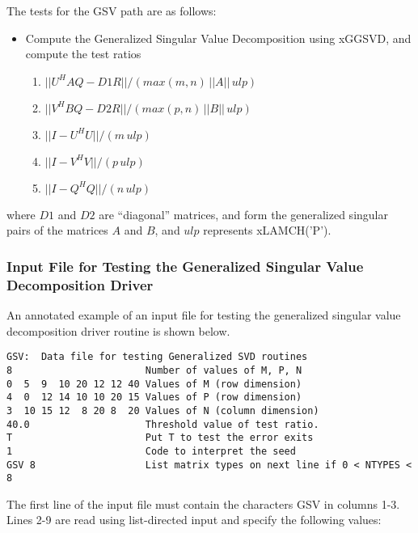 The tests for the GSV path are as follows:
\begin{itemize}
\item Compute the Generalized Singular Value Decomposition using xGGSVD,
and compute the test ratios
\begin{enumerate}
\item $|| U^H A Q - D1 R || / (max(m,n) \, ||A|| \, ulp)$
\item $|| V^H B Q - D2 R || / (max(p,n) \, ||B|| \, ulp)$
\item $|| I - U^H U || / (m \, ulp)$
\item $|| I - V^H V || / (p \, ulp)$
\item $|| I - Q^H Q || / (n \, ulp)$
\end{enumerate}
\end{itemize}
where $D1$ and $D2$ are ``diagonal'' matrices, and form the generalized
singular pairs of the matrices $A$ and $B$, and $ulp$ represents
xLAMCH('P').

\subsubsection{Input File for Testing the Generalized Singular Value Decomposition Driver}

\dent
An annotated example of an input file for testing the generalized
singular value decomposition driver routine is shown below.
\begin{verbatim}
GSV:  Data file for testing Generalized SVD routines
8                       Number of values of M, P, N
0  5  9  10 20 12 12 40 Values of M (row dimension)
4  0  12 14 10 10 20 15 Values of P (row dimension)
3  10 15 12  8 20 8  20 Values of N (column dimension)
40.0                    Threshold value of test ratio.
T                       Put T to test the error exits
1                       Code to interpret the seed
GSV 8                   List matrix types on next line if 0 < NTYPES < 8
\end{verbatim}

The first line of the input file must contain the characters GSV
in columns 1-3.  Lines 2-9 are read using list-directed input and
specify the following values:

